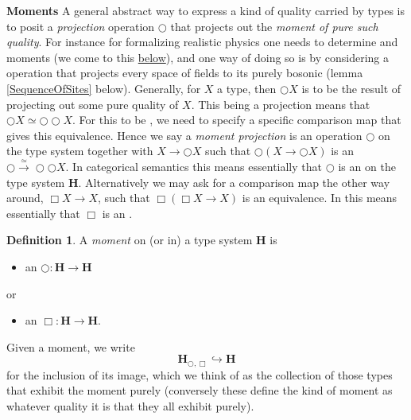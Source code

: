 \documentclass[12pt,titlepage]{article}
\theoremstyle{plain}
\theoremstyle{definition}
\newtheorem{defn}{Definition}
\theoremstyle{remark}
\begin{document}
\textbf{Moments}
A general abstract way to express a kind of quality carried by types is to posit a \emph{projection} operation $\bigcirc$ that projects out the \emph{moment of pure such quality}.
For instance for formalizing realistic physics one needs to determine  and  moments (we come to this \hyperlink{Externalization}{below}), and one way of doing so is by considering a  operation that projects every space of fields to its purely bosonic  (lemma \ref{SequenceOfSites} below).
Generally, for $X$ a type, then $\bigcirc X$ is to be the result of projecting out some pure quality of $X$. This being a projection means that $\bigcirc X  \simeq \bigcirc \bigcirc X$. For this to be , we need to specify a specific comparison map that gives this equivalence. Hence we say a \emph{moment projection} is an operation $\bigcirc$ on the type system together with  $X \to \bigcirc X$ such that $\bigcirc(X \to \bigcirc X)$ is an  $\bigcirc \stackrel{\simeq}{\longrightarrow} \bigcirc \bigcirc X$.
In categorical semantics this means essentially that $\bigcirc$ is an  on the type system $\mathbf{H}$.
Alternatively we may ask for a comparison map the other way around, $\Box X \longrightarrow X$, such that $\Box(\Box X \longrightarrow X)$ is an equivalence. In  this means essentially that $\Box$ is an .
\begin{defn}
\label{Moments}\hypertarget{Moments}{}
A \emph{moment} on (or in) a type system $\mathbf{H}$ is
\begin{itemize}%
\item an  $\bigcirc \colon \mathbf{H} \to \mathbf{H}$
\end{itemize}
or
\begin{itemize}%
\item an  $\Box \colon \mathbf{H} \to \mathbf{H}$.
\end{itemize}
Given a moment, we write
\begin{displaymath}
\mathbf{H}_{\bigcirc, \Box} \hookrightarrow \mathbf{H}
\end{displaymath}
for the inclusion of its image, which we think of as the collection of those types that exhibit the moment purely (conversely these define the kind of moment as whatever quality it is that they all exhibit purely).
\end{defn}
\end{document}
